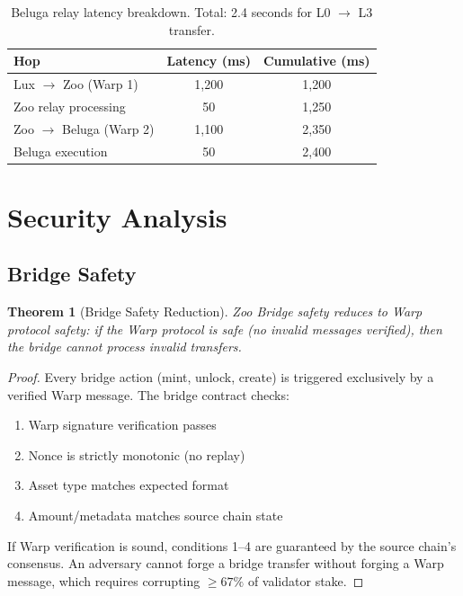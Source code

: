 \documentclass[11pt,letterpaper]{article}
\newtheorem{theorem}{Theorem}[section]
\begin{document}
\begin{table}[t]
\centering
\begin{tabular}{lcc}
\toprule
\textbf{Hop} & \textbf{Latency (ms)} & \textbf{Cumulative (ms)} \\
\midrule
Lux $\to$ Zoo (Warp 1) & 1,200 & 1,200 \\
Zoo relay processing & 50 & 1,250 \\
Zoo $\to$ Beluga (Warp 2) & 1,100 & 2,350 \\
Beluga execution & 50 & 2,400 \\
\bottomrule
\end{tabular}
\caption{Beluga relay latency breakdown. Total: 2.4 seconds for L0 $\to$ L3 transfer.}
\label{tab:relay}
\end{table}

\section{Security Analysis}
\label{sec:security}

\subsection{Bridge Safety}

\begin{theorem}[Bridge Safety Reduction]
Zoo Bridge safety reduces to Warp protocol safety: if the Warp protocol is safe (no invalid messages verified), then the bridge cannot process invalid transfers.
\end{theorem}

\begin{proof}
Every bridge action (mint, unlock, create) is triggered exclusively by a verified Warp message. The bridge contract checks:
\begin{enumerate}
    \item Warp signature verification passes
    \item Nonce is strictly monotonic (no replay)
    \item Asset type matches expected format
    \item Amount/metadata matches source chain state
\end{enumerate}
If Warp verification is sound, conditions 1--4 are guaranteed by the source chain's consensus. An adversary cannot forge a bridge transfer without forging a Warp message, which requires corrupting $\geq 67\%$ of validator stake.
\end{proof}
\end{document}
